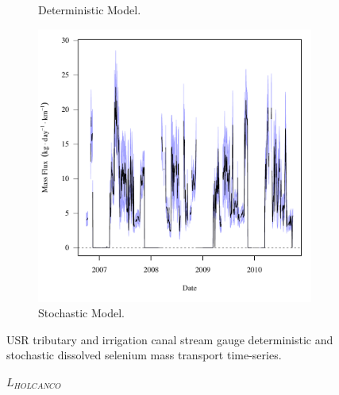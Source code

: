 \begin{linenumbers}
\begin{landscape}
\begin{figure}
\begin{subfigure}{0.7\textwidth}
			\caption{Deterministic Model.}
		\end{subfigure}%
		\begin{subfigure}{0.7\textwidth}
			\centering
			\includegraphics[width=\tableCustomSize]{"Figures/Results_USR/Stochastic/f FLY"}
			\caption{Stochastic Model.}
		\end{subfigure}
		\caption{USR tributary and irrigation canal stream gauge deterministic and stochastic dissolved selenium mass transport time-series.}
	\end{figure}
\end{landscape}
\subfiguremid
\begin{landscape}
	\begin{figure}
		$ \displaystyle L_{HOLCANCO} $
		\begin{subfigure}{0.7\textwidth}
			\centering

\end{subfigure}
\end{figure}
\end{landscape}
\end{linenumbers}
